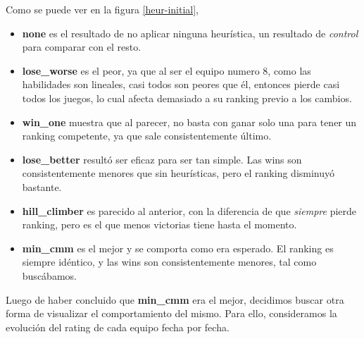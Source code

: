 \documentclass[a4paper]{article}
\begin{document}
Como se puede ver en la figura \ref{heur-initial},

\begin{itemize}
    \item \textbf{none} es el resultado de no aplicar ninguna heurística, un resultado de \textit{control} para comparar con el resto.
    \item \textbf{lose\_worse} es el peor, ya que al ser el equipo numero 8, como las habilidades son lineales, casi todos son peores que él, entonces pierde casi todos los juegos, lo cual afecta demasiado a su ranking previo a los cambios.
    \item \textbf{win\_one} muestra que al parecer, no basta con ganar solo una para tener un ranking competente, ya que sale consistentemente último.
    \item \textbf{lose\_better} resultó ser eficaz para ser tan simple. Las wins son consistentemente menores que sin heurísticas, pero el ranking disminuyó bastante.
    \item \textbf{hill\_climber} es parecido al anterior, con la diferencia de que \textit{siempre} pierde ranking, pero es el que menos victorias tiene hasta el momento.
    \item \textbf{min\_cmm} es el mejor y se comporta como era esperado. El ranking es siempre idéntico, y las wins son consistentemente menores, tal como buscábamos.
\end{itemize}

Luego de haber concluido que \textbf{min_cmm} era el mejor, decidimos buscar otra forma de visualizar el comportamiento del mismo. Para ello, consideramos la evolución del rating de cada equipo fecha por fecha.
\end{document}
